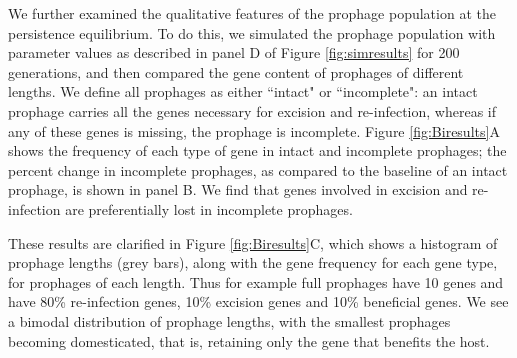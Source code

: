   We further examined the qualitative features of the prophage population at the persistence equilibrium.  To do this, we  simulated the prophage population with parameter values as described in panel D of Figure \ref{fig:simresults} for 200 generations, and then compared the gene content of prophages of different lengths.  We define all prophages as either ``intact"  or ``incomplete": an intact prophage carries all the genes necessary for excision and re-infection, whereas if any of these genes is missing, the prophage is incomplete. Figure \ref{fig:Biresults}A shows the frequency of each type of gene in intact and incomplete prophages; the percent change in incomplete prophages, as compared to the baseline of an intact prophage, is shown in panel B.  We find that genes involved in excision and re-infection are preferentially lost in incomplete prophages.  
 
 These results are clarified in Figure \ref{fig:Biresults}C, which shows a histogram of prophage lengths (grey bars), along with the gene frequency for each gene type, for prophages of each length.  Thus for example full prophages have 10 genes and have 80\% re-infection genes, 10\% excision genes and 10\% beneficial genes.  We see a bimodal distribution of prophage lengths, with the smallest prophages becoming domesticated, that is, retaining only the gene that benefits the host.
 
